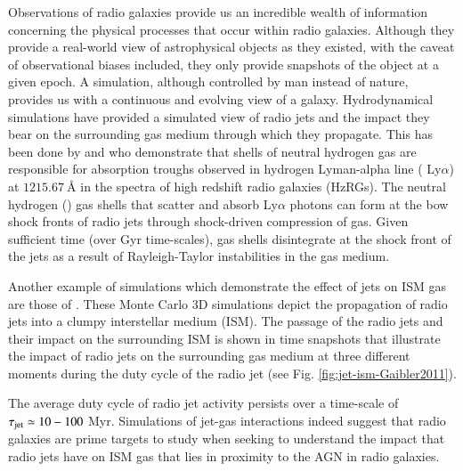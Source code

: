 Observations of radio galaxies provide us an incredible wealth of information concerning the physical processes that occur within radio galaxies. Although they provide a real-world view of astrophysical objects as they existed, with the caveat of observational biases included, they only provide snapshots of the object at a given epoch. A simulation, although controlled by man instead of nature, provides us with a continuous and evolving view of a galaxy. Hydrodynamical simulations have provided a simulated view of radio jets and the impact they bear on the surrounding gas medium through which they propagate. This has been done by \citet{krause2002} and \citet{krause2005} who demonstrate that shells of neutral hydrogen gas are responsible for absorption troughs observed in hydrogen Lyman-alpha line ( Ly$\alpha$) at $1215.67~\text{\AA}$ in the spectra of high redshift radio galaxies (HzRGs). The neutral hydrogen () gas shells that scatter and absorb Ly$\alpha$ photons can form at the bow shock fronts of radio jets through shock-driven compression of gas. Given sufficient time (over Gyr time-scales),  gas shells disintegrate at the shock front of the jets as a result of Rayleigh-Taylor instabilities in the gas medium. 

Another example of simulations which demonstrate the effect of jets on ISM gas are those of \citet{Gaibler2011}. These Monte Carlo 3D simulations depict the propagation of radio jets into a clumpy interstellar medium (ISM). The passage of the radio jets and their impact on the surrounding ISM is shown in time snapshots that illustrate the impact of radio jets on the surrounding gas medium at three different moments during the duty cycle of the radio jet (see Fig. \ref{fig:jet-ism-Gaibler2011}). 

The average duty cycle of radio jet activity persists over a time-scale of $\tau_{\rm jet} \simeq 10 - 100$ Myr. Simulations of jet-gas interactions indeed suggest that radio galaxies are prime targets to study when seeking to understand the impact that radio jets have on ISM gas that lies in proximity to the AGN in radio galaxies.

